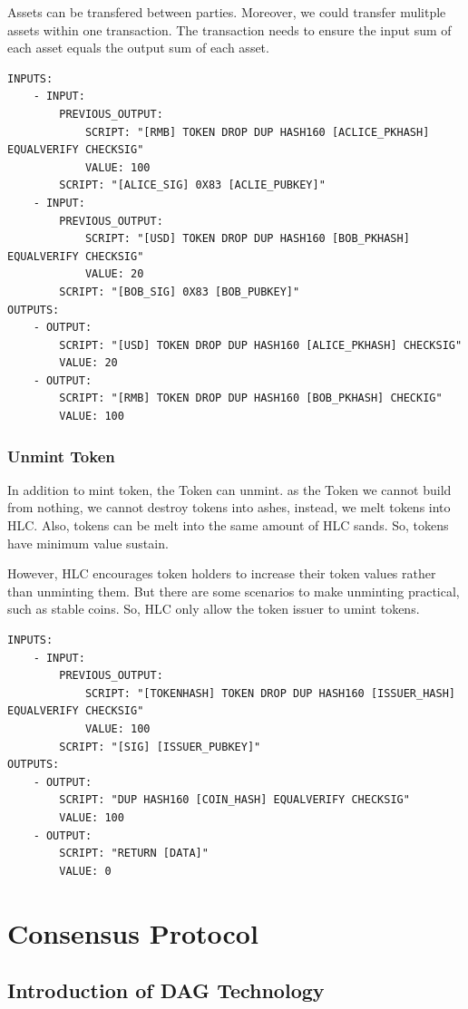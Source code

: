 \documentclass[a4paper,11pt]{article}
\begin{document}
Assets can be transfered between parties. Moreover, we could transfer mulitple assets within one transaction. The transaction needs to ensure the  input sum of each asset equals the output sum of each asset. 

\lstset{basicstyle=\tiny,style=myListStyle}
\begin{lstlisting}
INPUTS:
	- INPUT:
		PREVIOUS_OUTPUT:
			SCRIPT: "[RMB] TOKEN DROP DUP HASH160 [ACLICE_PKHASH] EQUALVERIFY CHECKSIG"
			VALUE: 100
		SCRIPT: "[ALICE_SIG] 0X83 [ACLIE_PUBKEY]"
	- INPUT:
		PREVIOUS_OUTPUT:
			SCRIPT: "[USD] TOKEN DROP DUP HASH160 [BOB_PKHASH] EQUALVERIFY CHECKSIG"
			VALUE: 20
		SCRIPT: "[BOB_SIG] 0X83 [BOB_PUBKEY]"
OUTPUTS:
	- OUTPUT:
		SCRIPT: "[USD] TOKEN DROP DUP HASH160 [ALICE_PKHASH] CHECKSIG"
		VALUE: 20
	- OUTPUT:
		SCRIPT: "[RMB] TOKEN DROP DUP HASH160 [BOB_PKHASH] CHECKIG"
		VALUE: 100
\end{lstlisting}


\subsubsection{Unmint Token}

In addition to mint token, the Token can unmint. as the Token  we cannot build from nothing, we cannot destroy tokens into ashes, instead, we melt  tokens into HLC. Also, tokens can be melt into the same amount of HLC sands. So, tokens have minimum value sustain. 

However, HLC encourages token holders to increase their token values rather than unminting them. But there are some scenarios to make unminting practical, such as stable coins. So, HLC only allow the token issuer to umint tokens.

\lstset{basicstyle=\tiny,style=myListStyle}
\begin{lstlisting}
INPUTS:
	- INPUT:
		PREVIOUS_OUTPUT:
			SCRIPT: "[TOKENHASH] TOKEN DROP DUP HASH160 [ISSUER_HASH] EQUALVERIFY CHECKSIG"
			VALUE: 100
		SCRIPT: "[SIG] [ISSUER_PUBKEY]"
OUTPUTS:
	- OUTPUT:
		SCRIPT: "DUP HASH160 [COIN_HASH] EQUALVERIFY CHECKSIG"
		VALUE: 100
	- OUTPUT:
		SCRIPT: "RETURN [DATA]"
		VALUE: 0
\end{lstlisting}


\section{Consensus Protocol}


\subsection{Introduction of DAG Technology}
\end{document}
